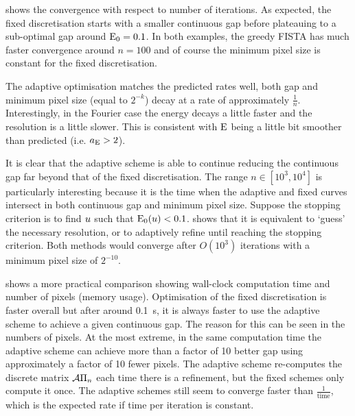 \documentclass[10pt,a4paper,onecolumn]{article}
\numberwithin{equation}{section}
\newcommand{\op}[1]{\operatorname{#1}}\newcommand{\overtext}[2]{\stackrel{\text{#1}}{#2}}
\newcommand*{\Func}[1]{%
	\IfEqCase{#1}{%
		{0}{\op{E}}%
		{1}{\op{F}}%
		{2}{\op{G}}%
		{3}{\op{H}}%
	}[\op{F}#1]%
}
\newcommand*{\varf}[1]{%
	\IfEqCase{#1}{%
		{0}{u}%
		{1}{v}%
		{2}{w}%
	}[u#1]%
}
\newcommand*{\vars}[1]{%
	\IfEqCase{#1}{%
		{0}{\alpha}%
		{1}{\beta}%
		{2}{\gamma}%
		{3}{a}%
		{4}{b}%
		{5}{c}%
	}[k#1]%
}
\begin{document}
 shows the convergence with respect to number of iterations. As expected, the fixed discretisation starts with a smaller continuous gap before plateauing to a sub-optimal gap around $\Func0_0=0.1$. In both examples, the greedy FISTA has much faster convergence around $n=100$ and of course the minimum pixel size is constant for the fixed discretisation. 

The adaptive optimisation matches the predicted rates well, both gap and minimum pixel size (equal to $2^{-k}$) decay at a rate of approximately $\frac1n$. Interestingly, in the Fourier case the energy decays a little faster and the resolution is a little slower. This is consistent with $\Func0$ being a little bit smoother than predicted (i.e. $\vars3_{\Func0}>2$). 

It is clear that the adaptive scheme is able to continue reducing the continuous gap far beyond that of the fixed discretisation. The range $n\in[10^3,10^4]$ is particularly interesting because it is the time when the adaptive and fixed curves intersect in both continuous gap and minimum pixel size. Suppose the stopping criterion is to find $\varf0$ such that $\Func0_0(\varf0)<0.1$.  shows that it is equivalent to `guess' the necessary resolution, or to adaptively refine until reaching the stopping criterion. Both methods would converge after $O(10^3)$ iterations with a minimum pixel size of $2^{-10}$.

 shows a more practical comparison showing wall-clock computation time and number of pixels (memory usage). Optimisation of the fixed discretisation is faster overall but after around \SI{0.1}{\second}, it is always faster to use the adaptive scheme to achieve a given continuous gap. The reason for this can be seen in the numbers of pixels. At the most extreme, in the same computation time the adaptive scheme can achieve more than a factor of 10 better gap using approximately a factor of 10 fewer pixels. The adaptive scheme re-computes the discrete matrix $\mathcal{A}\Pi_n$ each time there is a refinement, but the fixed schemes only compute it once. The adaptive schemes still seem to converge faster than $\frac1{\op{time}}$, which is the expected rate if time per iteration is constant.
\end{document}
